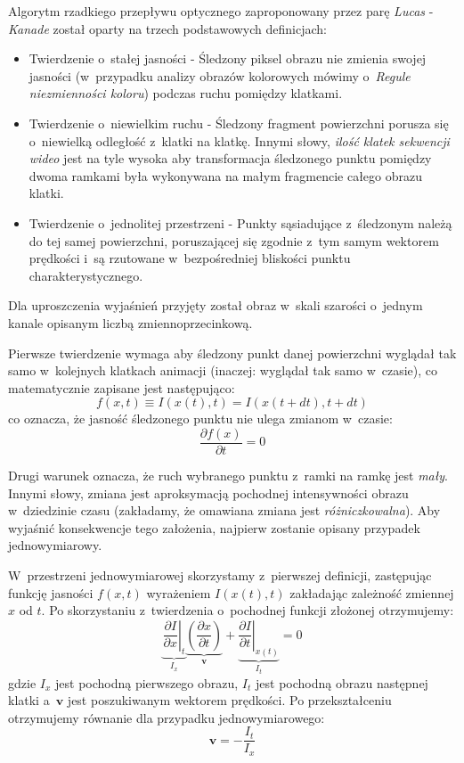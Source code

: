     \newpage
    Algorytm rzadkiego przepływu optycznego zaproponowany przez parę \textit{Lucas} - \textit{Kanade} został oparty na trzech podstawowych definicjach:
    \begin{itemize}
      \item Twierdzenie o~stałej jasności - Śledzony piksel obrazu nie zmienia swojej jasności (w~przypadku analizy obrazów kolorowych mówimy o~\textit{Regule niezmienności koloru}) podczas ruchu pomiędzy klatkami.
      \item Twierdzenie o~niewielkim ruchu - Śledzony fragment powierzchni porusza się o~niewielką odległość z~klatki na klatkę. Innymi słowy, \textit{ilość klatek sekwencji wideo} jest na tyle wysoka aby transformacja śledzonego punktu pomiędzy dwoma ramkami była wykonywana na małym fragmencie całego obrazu klatki.
      \item Twierdzenie o~jednolitej przestrzeni - Punkty sąsiadujące z~śledzonym należą do tej samej powierzchni, poruszającej się zgodnie z~tym samym wektorem prędkości i~są rzutowane w~bezpośredniej bliskości punktu charakterystycznego.
    \end{itemize}

    Dla uproszczenia wyjaśnień przyjęty został obraz w~skali szarości o~jednym kanale opisanym liczbą zmiennoprzecinkową.

    Pierwsze twierdzenie wymaga aby śledzony punkt danej powierzchni wyglądał tak samo w~kolejnych klatkach animacji (inaczej: wyglądał tak samo w~czasie), co matematycznie zapisane jest następująco: \[ f(x, t) \equiv I(x(t), t) = I(x(t + dt), t + dt) \] co oznacza, że jasność śledzonego punktu nie ulega zmianom w~czasie: \[ \frac{\partial f(x)}{\partial t} = 0 \]

    Drugi warunek oznacza, że ruch wybranego punktu z~ramki na ramkę jest \textit{mały}. Innymi słowy, zmiana jest aproksymacją pochodnej intensywności obrazu w~dziedzinie czasu (zakładamy, że omawiana zmiana jest \textit{różniczkowalna}). Aby wyjaśnić konsekwencje tego założenia, najpierw zostanie opisany przypadek jednowymiarowy.

    W~przestrzeni jednowymiarowej skorzystamy z~pierwszej definicji, zastępując funkcję jasności $f(x,t)$ wyrażeniem $I(x(t), t)$ zakładając zależność zmiennej $x$ od $t$. Po skorzystaniu z~twierdzenia o~pochodnej funkcji złożonej otrzymujemy: \[ \underbrace{ \left. \frac{\partial I}{\partial x}\right|_{t} }_{I_{x}} \underbrace{ \left(\frac{\partial x}{\partial t}\right) }_{\mathbf{v}} + \underbrace{ \left. \frac{\partial I}{\partial t}\right|_{x(t)} }_{I_{t}} = 0 \] gdzie $I_{x}$ jest pochodną pierwszego obrazu, $I_{t}$ jest pochodną obrazu następnej klatki a~$\mathbf{v}$ jest poszukiwanym wektorem prędkości. Po przekształceniu otrzymujemy równanie dla przypadku jednowymiarowego: \[ \mathbf{v} = -\frac{I_{t}}{I_{x}} \]

